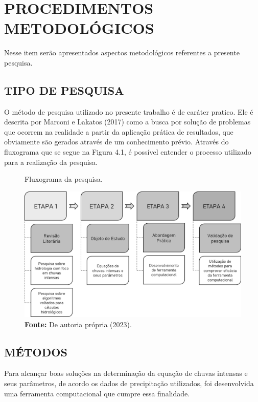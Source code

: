\chapter{PROCEDIMENTOS METODOLÓGICOS}

Nesse item serão apresentados aspectos metodológicos referentes a
presente pesquisa.

\section{TIPO DE PESQUISA}

O método de pesquisa utilizado no presente trabalho é de caráter pratico. Ele é descrita por Marconi e Lakatos (2017) como a busca por solução de problemas que ocorrem na realidade a partir da aplicação prática de resultados, que obviamente são gerados através de um conhecimento prévio. Através do fluxograma que se segue na Figura 4.1, é possível entender o processo utilizado para a realização da pesquisa.\bigskip

\begin{figure}[!ht]
	\centering
	\caption{Fluxograma da pesquisa.}
	\includegraphics[width=.7625\linewidth]{figuras/fluxograma_de_pesquisa.png}
	\caption*{\textbf{Fonte:} De autoria própria (2023).}
	\label{fig:fluxograma_de_pesquisa.png}
\end{figure}


\section{MÉTODOS}

Para alcançar boas soluções na determinação da equação de chuvas intensas e seus parâmetros, de acordo os dados de precipitação utilizados, foi desenvolvida uma ferramenta computacional que cumpre essa finalidade.

